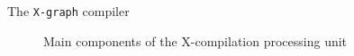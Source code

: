 \documentclass{beamer}
\begin{document}
\begin{frame}{The \texttt{X-graph} compiler}
\begin{figure}
  \centering
  \caption{Main components of the X-compilation processing unit}
\end{figure}
\end{frame}
\end{document}
